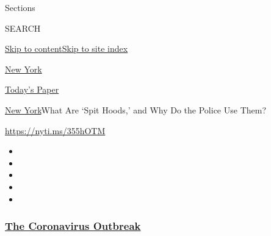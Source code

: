 Sections

SEARCH

\protect\hyperlink{site-content}{Skip to
content}\protect\hyperlink{site-index}{Skip to site index}

\href{https://www.nytimes3xbfgragh.onion/section/nyregion}{New York}

\href{https://myaccount.nytimes3xbfgragh.onion/auth/login?response_type=cookie\&client_id=vi}{}

\href{https://www.nytimes3xbfgragh.onion/section/todayspaper}{Today's
Paper}

\href{/section/nyregion}{New York}\textbar{}What Are `Spit Hoods,' and
Why Do the Police Use Them?

\url{https://nyti.ms/355hOTM}

\begin{itemize}
\item
\item
\item
\item
\item
\end{itemize}

\hypertarget{the-coronavirus-outbreak}{%
\subsubsection{\texorpdfstring{\href{https://www.nytimes3xbfgragh.onion/news-event/coronavirus?name=styln-coronavirus-national\&region=TOP_BANNER\&block=storyline_menu_recirc\&action=click\&pgtype=Article\&impression_id=ee4143a0-f2ad-11ea-a65f-f7b3510e8f53\&variant=undefined}{The
Coronavirus
Outbreak}}{The Coronavirus Outbreak}}\label{the-coronavirus-outbreak}}

